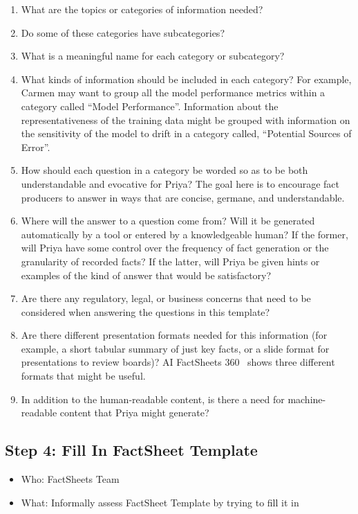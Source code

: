 \documentclass[11pt,dvipdfm]{article}
\begin{document}
\begin{enumerate}
    \item What are the topics or categories of information needed?
    \item Do some of these categories have subcategories?
    \item What is a meaningful name for each category or subcategory?
    \item What kinds of information should be included in each category? For example, Carmen may want to group all the model performance metrics within a category called ``Model Performance''. Information about the representativeness of the training data might be grouped with information on the sensitivity of the model to drift in a category called, ``Potential Sources of Error''.
    \item How should each question in a category be worded so as to be both understandable and evocative for Priya? The goal here is to encourage fact producers to answer in ways that are concise, germane, and understandable.
    \item Where will the answer to a question come from? Will it be generated automatically by a tool or entered by a knowledgeable human? If the former, will Priya have some control over the frequency of fact generation or the granularity of recorded facts? If the latter, will Priya be given hints or examples of the kind of answer that would be satisfactory?
    \item Are there any regulatory, legal, or business concerns that need to be considered when answering the questions in this template?
    \item Are there different presentation formats needed for this information (for example, a short tabular summary of just key facts, or a slide format for presentations to review boards)? AI FactSheets 360~\cite{fs360} shows three different formats that might be useful.
    \item In addition to the human-readable content, is there a need for machine-readable content that Priya might generate?
\end{enumerate}

\subsection{Step 4: Fill In FactSheet Template}

\begin{itemize}[noitemsep,nolistsep]
    \item Who: FactSheets Team
    \item What: Informally assess FactSheet Template by trying to fill it in
\end{itemize}
\hspace{.2cm}
\end{document}
